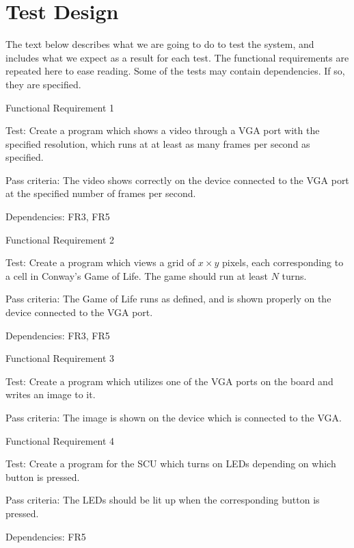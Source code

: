 \section{Test Design}

The text below describes what we are going to do to test the system, and
includes what we expect as a result for each test. The functional requirements
are repeated here to ease reading. Some of the tests may contain
dependencies\footnotemark. If so, they are specified.


{\sc Functional Requirement 1}
\begin{Test}
  {\em \FRI}

  {\sc Test:} Create a program which shows a video through a \ac{VGA} port with
  the specified resolution, which runs at at least as many frames per second as
  specified.

  {\sc Pass criteria:} The video shows correctly on the device connected to the
  \ac{VGA} port at the specified number of frames per second.
  
  {\sc Dependencies:} FR3, FR5
\end{Test}

{\sc Functional Requirement 2}
\begin{Test}
  {\em \FRII}
  
  {\sc Test:} Create a program which views a grid of $x \times y$ pixels, each
  corresponding to a cell in Conway's Game of
  Life\cite{gardner1970mathematical}. The game should run at least $N$ turns.

  {\sc Pass criteria:} The Game of Life runs as defined, and is shown properly
  on the device connected to the \ac{VGA} port.

  {\sc Dependencies:} FR3, FR5
\end{Test}

{\sc Functional Requirement 3}
\begin{Test}
  {\em \FRIII}
  
  {\sc Test:} Create a program which utilizes one of the \ac{VGA} ports on the
  board and writes an image to it.

  {\sc Pass criteria:} The image is shown on the device which is connected to
  the \ac{VGA}.
\end{Test}

{\sc Functional Requirement 4}
\begin{Test}
  {\em \FRIV}
  
  {\sc Test:} Create a program for the \ac{SCU} which turns on \acp{LED}
  depending on which button is pressed.

  {\sc Pass criteria:} The \acp{LED} should be lit up when the corresponding
  button is pressed.

  {\sc Dependencies:} FR5
\end{Test}

